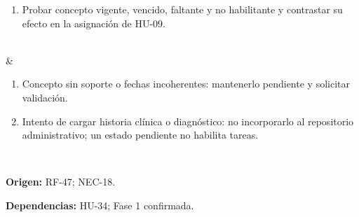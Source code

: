 \documentclass[12pt,letterpaper]{article}
\begin{document}
{\begin{enumerate}[nosep,leftmargin=*]
\item Probar concepto vigente, vencido, faltante y no habilitante y contrastar su efecto en la asignación de HU-09.
\end{enumerate}\\\hline
{} & \begin{enumerate}[nosep,leftmargin=*]
\item Concepto sin soporte o fechas incoherentes: mantenerlo pendiente y solicitar validación.
\item Intento de cargar historia clínica o diagnóstico: no incorporarlo al repositorio administrativo; un estado pendiente no habilita tareas.
\end{enumerate}\\\hline
}
{\textbf{Origen:} RF-47; NEC-18.\par
\textbf{Dependencias:} HU-34; Fase 1 confirmada.}
\end{document}
